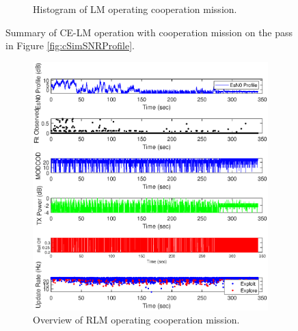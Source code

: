 \begin{figure}[ht!]
\begin{subfigure}{\linewidth}
	\caption{Histogram of LM operating cooperation mission.}
	\label{fig:cSimLMHists}
\end{subfigure}
\caption{Summary of CE-LM operation with cooperation mission on the pass in Figure \ref{fig:cSimSNRProfile}.}
\label{fig:c22LMCoop}
\end{figure}

\begin{figure}[ht!]
\centering
\begin{subfigure}{\linewidth}
	\centering
	\includegraphics[scale=0.5]{figures/c_sim_results/sim22_RLM_overview_coop.eps}
	\caption{Overview of RLM operating cooperation mission.}
	\label{fig:cSimLMOverview}
\end{subfigure}\\
\begin{subfigure}{\linewidth}
	\centering

\end{subfigure}
\end{figure}
